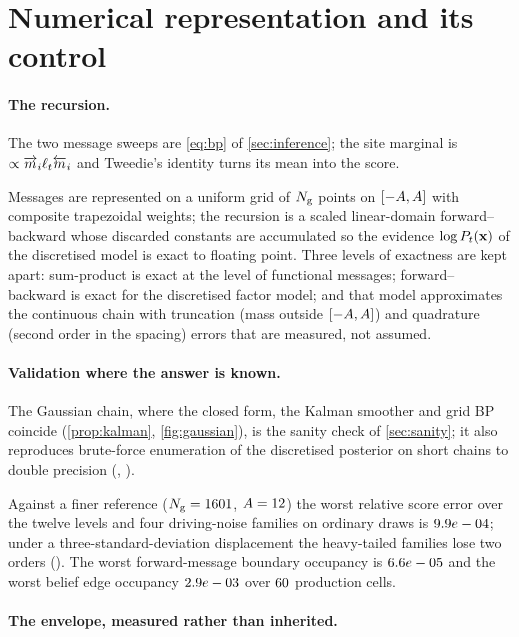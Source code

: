 \section{Numerical representation and its control}
\label{app:numerics}
\paragraph{The recursion.}
The two message sweeps are \cref{eq:bp} of \cref{sec:inference}; the site marginal is $\propto\overrightarrow{m}_i\ell_t\overleftarrow{m}_i$ and Tweedie's identity turns its mean into the score.

Messages are represented on a uniform grid of $N_{\mathrm{g}}$ points on
$[-A,A]$ with composite trapezoidal weights; the recursion is a scaled
linear-domain forward--backward whose discarded constants are accumulated so the
evidence $\log P_t(\mathbf{x})$ of the discretised model is exact to floating point. Three
levels of exactness are kept apart: sum-product is exact at the level of functional
messages; forward--backward is exact for the discretised factor model; and that model
approximates the continuous chain with truncation (mass outside $[-A,A]$)
and quadrature (second order in the spacing) errors that are measured, not assumed.

\paragraph{Validation where the answer is known.}
The Gaussian chain, where the closed form, the Kalman smoother and grid BP coincide (\cref{prop:kalman}, \cref{fig:gaussian}), is the sanity check of \cref{sec:sanity}; it also reproduces brute-force enumeration of the discretised posterior on short chains to double precision (, ).

Against a finer reference
($N_{\mathrm{g}}=1601$, $A=12$) the worst relative score error over the twelve levels
and four driving-noise families on ordinary draws is $9.9e-04$; under a
three-standard-deviation displacement the heavy-tailed families lose two orders
(\gcworstshift). The worst forward-message boundary occupancy is $6.6e-05$ and the
worst belief edge occupancy $2.9e-03$ over $60$ production cells.

\paragraph{The envelope, measured rather than inherited.}


